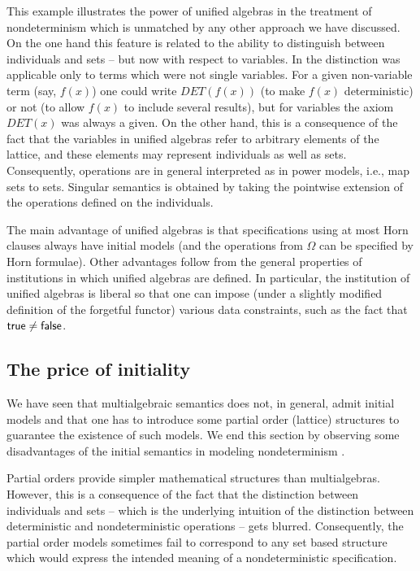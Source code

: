 {This example illustrates the power of unified algebras in the
treatment of nondeterminism which is unmatched by any other approach
we have discussed. On the one hand this feature is related to the
ability to distinguish between individuals and sets -- but now with
respect to variables. In \cite{c:58, c:59} the distinction was
applicable only to terms which were not single variables. For a given
non-variable term (say, $f(x)$) one could write $DET(f(x))$ (to make
$f(x)$ deterministic) or not (to allow $f(x)$ to include several
results), but for variables the axiom $DET(x)$ was always a given. On
the other hand, this is a consequence of the fact that the variables
in unified algebras refer to arbitrary elements of the lattice, and
these elements may represent individuals as well as
sets. Consequently, operations are in general interpreted as in power
models, i.e., map sets to sets. Singular semantics is obtained 
by taking the pointwise extension of the operations
defined on the individuals.

The main advantage of unified algebras is that specifications using at most Horn clauses always have 
initial models (and the operations from $\Omega$ can be specified by Horn formulae). Other advantages follow 
from the general properties of institutions \cite{c:41, c:112, c:122} in which unified algebras are defined. In 
particular, the institution of unified algebras is liberal so that one can impose (under a slightly modified 
definition of the forgetful functor) various data constraints, such as 
the fact that ${\sf true}\not= {\sf false}$.

\subsection{The price of initiality} 
We have seen that multialgebraic semantics does not, in general, admit initial models and that one has to 
introduce some partial order (lattice) structures to guarantee the existence of such models. We end this 
section by observing some disadvantages of the initial semantics in modeling nondeterminism \cite{c:128}.

Partial orders provide simpler mathematical structures than multialgebras. However, this is a 
consequence of the fact that the distinction between individuals and 
sets -- which is the underlying 
intuition of the distinction between deterministic and nondeterministic 
operations -- gets blurred. 
Consequently, the partial order models sometimes fail to correspond to any set based structure which 
would express the intended meaning of a nondeterministic specification. 

}
